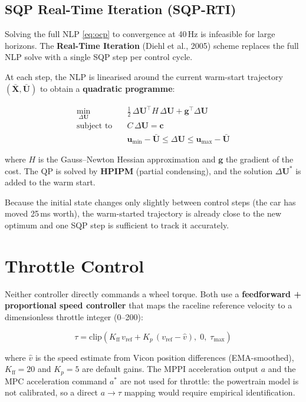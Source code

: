 \documentclass[11pt]{article}
\begin{document}
\subsection{SQP Real-Time Iteration (SQP-RTI)}

Solving the full NLP \eqref{eq:ocp} to convergence at 40\,Hz is infeasible for
large horizons.  The \textbf{Real-Time Iteration} (Diehl et al., 2005) scheme
replaces the full NLP solve with a single SQP step per control cycle.

At each step, the NLP is linearised around the current warm-start trajectory
$(\bar{\bm{X}}, \bar{\bm{U}})$ to obtain a \textbf{quadratic programme}:

\begin{align}
\min_{\Delta\bm{U}} \quad
  &\frac{1}{2}\,\Delta\bm{U}^{\!\top} H\,\Delta\bm{U}
  + \bm{g}^{\!\top}\Delta\bm{U} \\
\text{subject to} \quad
  &C\,\Delta\bm{U} = \bm{c} \tag{linearised dynamics}\\
  &\bm{u}_{\min} - \bar{\bm{U}} \leq \Delta\bm{U} \leq \bm{u}_{\max} - \bar{\bm{U}} \tag{input bounds}
\end{align}

where $H$ is the Gauss--Newton Hessian approximation and $\bm{g}$ the gradient
of the cost.  The QP is solved by \textbf{HPIPM} (partial condensing), and the
solution $\Delta\bm{U}^*$ is added to the warm start.

Because the initial state changes only slightly between control steps (the car
has moved 25\,ms worth), the warm-started trajectory is already close to the new
optimum and one SQP step is sufficient to track it accurately.



\section{Throttle Control}

Neither controller directly commands a wheel torque.  Both use a
\textbf{feedforward + proportional speed controller} that maps the raceline
reference velocity to a dimensionless throttle integer (0--200):

\[
\tau = \mathrm{clip}\!\left(K_{\mathrm{ff}}\, v_{\mathrm{ref}} + K_p\,(v_{\mathrm{ref}} - \hat{v}),\; 0,\; \tau_{\max}\right)
\]

where $\hat{v}$ is the speed estimate from Vicon position differences
(EMA-smoothed), $K_{\mathrm{ff}} = 20$ and $K_p = 5$ are default gains.
The MPPI acceleration output $a$ and the MPC acceleration command $a^*$ are
not used for throttle: the powertrain model is not calibrated, so a direct
$a \to \tau$ mapping would require empirical identification.
\end{document}
